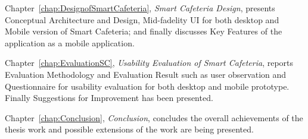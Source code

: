 Chapter~\ref{chap:DesignofSmartCafeteria}, \textit{Smart Cafeteria Design},
presents Conceptual Architecture and Design, Mid-fadelity UI for both desktop
and Mobile version of Smart Cafeteria; and finally discusses Key Features of
the application as a mobile application.

Chapter~\ref{chap:EvaluationSC}, \textit{Usability Evaluation of Smart
Cafeteria}, reports Evaluation Methodology and Evaluation Result such as user
observation and Questionnaire for usability evaluation for both desktop and
mobile prototype. Finally Suggestions for Improvement has been presented.

Chapter~\ref{chap:Conclusion}, \textit{Conclusion}, concludes the overall
achievements of the thesis work and possible extensions of the work are being
presented.

